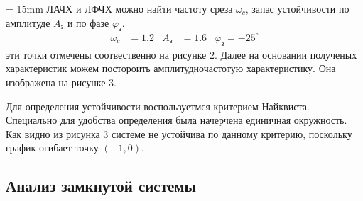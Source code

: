 \documentclass[a4paper, 12pt]{article}
\begin{document}
\noindent
\begin{minipage}[t]{0.6\textwidth}
	\parindent = 15mm
	 ЛАЧХ и ЛФЧХ можно найти частоту среза $\omega_c$, запас устойчивости по амплитуде $A_\text{з}$ и по фазе $\varphi_\text{з}$.
	\begin{align*}
	\omega_c & = 1.2 & A_\text{з} & = 1.6 & \varphi_\text{з} = -25^\circ
	\end{align*}
	 эти точки отмечены соотвественно на рисунке 2. Далее на основании полученых характеристик можем постороить амплитудночастотую характеристику. Она изображена на рисунке 3. \par
	Для определения устойчивости воспользуетмся критерием Найквиста. Специально для удобства определения была начерчена единичная окружность. Как видно из рисунка 3 системе не устойчива по данному критерию, поскольку график огибает точку $(-1, 0)$.
\end{minipage}
\newpage
\begin{center}
	\section{Анализ замкнутой системы}
\end{center}
\end{document}
